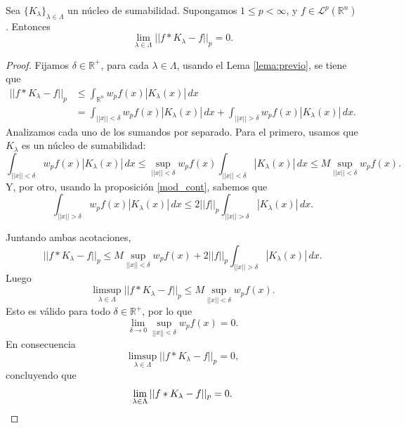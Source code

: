 \begin{teorema} \label{teo:suma}
    Sea $\{K_{\lambda}\}_{\lambda \in \Lambda}$ un núcleo de sumabilidad. Supongamos $1 \leq p < \infty$, y $f \in \mathscr{L}^p(\mathbb{R}^n)$. Entonces
    \begin{equation}
        \lim_{\lambda \in \Lambda} ||f*K_{\lambda}-f||_p=0.
    \end{equation}
\end{teorema}
\begin{proof}
Fijamos $\delta \in \mathbb{R}^+$, para cada $\lambda \in \Lambda$, usando el Lema \ref{lema:previo}, se tiene que
\begin{align}
    || f*K_{\lambda}-f||_p &\leq \int_{\mathbb{R}^n} w_pf(x) |K_{\lambda}(x)| \, dx \\
    &= \int_{||x|| < \delta} w_pf(x) |K_{\lambda}(x)| \, dx +\int_{||x|| > \delta} w_pf(x) |K_{\lambda}(x)| \, dx.
\end{align}
\noindent Analizamos cada uno de los sumandos por separado. Para el primero, usamos que $K_{\lambda}$ es un núcleo de sumabilidad:
\begin{equation}
    \int_{||x|| < \delta} w_pf(x) |K_{\lambda}(x)| \, dx \leq \sup_{||x|| < \delta}w_pf(x)\int_{||x|| < \delta} |K_{\lambda}(x)| \, dx  \leq M\sup_{||x|| < \delta}w_pf(x).
\end{equation}
\noindent Y, por otro, usando la proposición \ref{mod_cont}, sabemos que
\begin{equation}
    \int_{||x|| > \delta} w_pf(x) |K_{\lambda}(x)| \, dx \leq 2 ||f||_p\int_{||x|| > \delta} |K_{\lambda}(x)| \, dx.
\end{equation}

\noindent Juntando ambas acotaciones,   
\begin{equation}
     || f*K_{\lambda}-f||_p \leq M\sup_{||x|| < \delta}w_pf(x)+ 2 ||f||_p\int_{||x|| > \delta} |K_{\lambda}(x)| \, dx.
\end{equation}
Luego
\begin{equation}
    \limsup_{\lambda \in \Lambda}|| f*K_{\lambda}-f||_p \leq M\sup_{||x|| < \delta}w_pf(x).
\end{equation}
Esto es válido para todo $\delta \in \mathbb{R}^+$, por lo que 
\begin{equation}
    \lim_{\delta \rightarrow 0}\sup_{||x|| < \delta}w_pf(x)= 0.
\end{equation}
En consecuencia
\begin{equation}
    \limsup_{\lambda \in \Lambda}|| f*K_{\lambda}-f||_p =0,
\end{equation}
concluyendo que 
\begin{equation*}
    \lim_{\lambda \in \Lambda}|| f*K_{\lambda}-f||_p =0.\qedhere
\end{equation*}
\end{proof}


